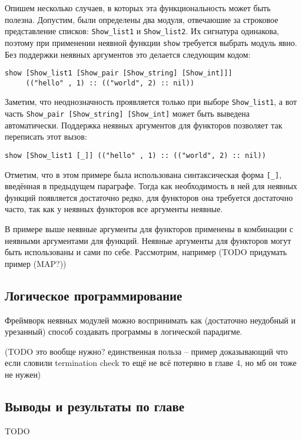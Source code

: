 \documentclass[../diploma.tex]{subfiles}
\begin{document}
Опишем несколько случаев, в которых эта функциональность может быть полезна. Допустим, были определены два модуля, отвечаюшие за строковое представление списков: \texttt{Show_list1} и \texttt{Show_list2}. Их сигнатура одинакова, поэтому при применении неявной функции \texttt{show} требуется выбрать модуль явно. Без поддержки неявных аргументов это делается следующим кодом:

\begin{verbatim}
show [Show_list1 [Show_pair [Show_string] [Show_int]]]
     (("hello" , 1) :: (("world", 2) :: nil))
\end{verbatim}

Заметим, что неоднозначность проявляется только при выборе \texttt{Show_list1}, а вот часть \texttt{Show_pair [Show_string] [Show_int]} может быть выведена автоматически. Поддержка неявных аргументов для функторов позволяет так переписать этот вызов:

\begin{verbatim}
show [Show_list1 [_]] (("hello" , 1) :: (("world", 2) :: nil))
\end{verbatim}

Отметим, что в этом примере была использована синтаксическая форма \texttt{[_]}, введённая в предыдущем параграфе. Тогда как необходимость в ней для неявных функций появляется достаточно редко, для функторов она требуется достаточно часто, так как у неявных функторов все аргументы неявные.

В примере выше неявные аргументы для функторов применены в комбинации с неявными аргументами для функций. Неявные аргументы для функторов могут быть использованы и сами по себе. Рассмотрим, например (TODO придумать пример (MAP?))

\subsection{Логическое программирование}

Фреймворк неявных модулей можно воспринимать как (достаточно неудобный и урезанный) способ создавать программы в логической парадигме. 

(TODO это вообще нужно? единственная польза -- пример доказывающий что если словили termination check то ещё не всё потеряно в главе 4, но мб он тоже не нужен)

\subsection{Выводы и результаты по главе}

TODO
\end{document}
